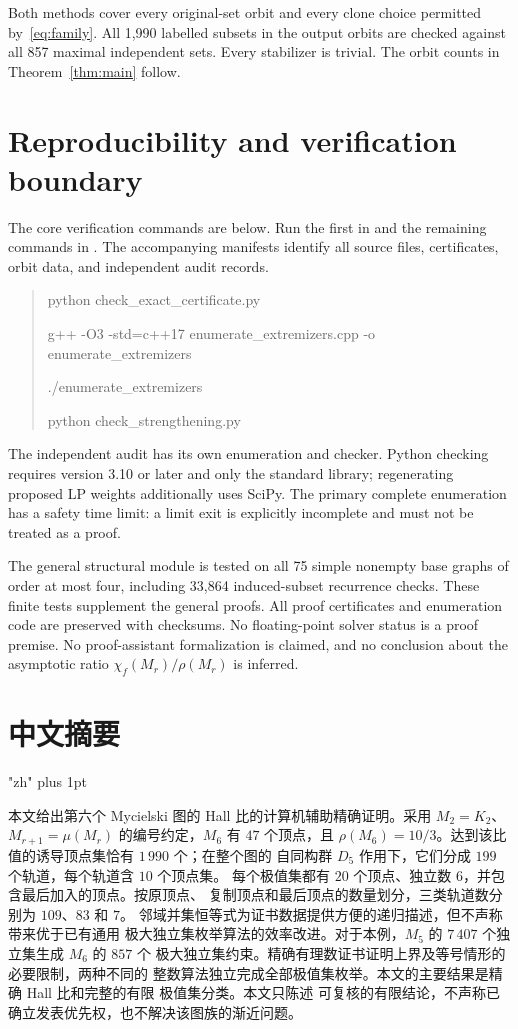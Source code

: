 \documentclass[11pt,letterpaper]{article}
\theoremstyle{remark}
\begin{document}
Both methods cover every original-set orbit and every clone choice
permitted by~\eqref{eq:family}. All 1,990 labelled subsets in the output
orbits are checked against all 857 maximal independent sets. Every
stabilizer is trivial. The orbit counts in Theorem~\ref{thm:main} follow.

\section{Reproducibility and verification boundary}
The core verification commands are below. Run the first in
 and the remaining commands in
. The accompanying manifests identify all
source files, certificates, orbit data, and independent audit records.
\begin{quote}\begin{minipage}{\linewidth}\small\ttfamily
python check\_exact\_certificate.py\par
 g++ -O3 -std=c++17 enumerate\_extremizers.cpp -o enumerate\_extremizers\par
 ./enumerate\_extremizers\par
 python check\_strengthening.py
\end{minipage}\end{quote}
The independent audit has its own enumeration and checker. Python checking requires version 3.10 or later and only the
standard library; regenerating proposed LP weights additionally uses
SciPy. The primary complete enumeration has a safety time limit: a limit
exit is explicitly incomplete and must not be treated as a proof.

The general structural module is tested on all 75 simple nonempty base
graphs of order at most four, including 33,864 induced-subset recurrence
checks. These finite tests supplement the general proofs. All proof
certificates and enumeration code are preserved with checksums.
No floating-point solver status is a proof premise. No proof-assistant
formalization is claimed, and no conclusion about the asymptotic ratio
$\chi_f(M_r)/\rho(M_r)$ is inferred.

\section*{\chinesefont 中文摘要}
\begingroup\chinesefont
\XeTeXlinebreaklocale "zh"
\XeTeXlinebreakskip=0pt plus 1pt

本文给出第六个 Mycielski 图的 Hall 比的计算机辅助精确证明。采用
$M_2=K_2$、$M_{r+1}=\mu(M_r)$ 的编号约定，$M_6$ 有 $47$ 个顶点，且
$\rho(M_6)=10/3$。达到该比值的诱导顶点集恰有 $1\,990$ 个；在整个图的
自同构群 $D_5$ 作用下，它们分成 $199$ 个轨道，每个轨道含 $10$ 个顶点集。
每个极值集都有 $20$ 个顶点、独立数 $6$，并包含最后加入的顶点。按原顶点、
复制顶点和最后顶点的数量划分，三类轨道数分别为 $109$、$83$ 和 $7$。
邻域并集恒等式为证书数据提供方便的递归描述，但不声称带来优于已有通用
极大独立集枚举算法的效率改进。对于本例，$M_5$ 的 $7\,407$ 个独立集生成 $M_6$ 的 $857$ 个
极大独立集约束。精确有理数证书证明上界及等号情形的必要限制，两种不同的
整数算法独立完成全部极值集枚举。本文的主要结果是精确 Hall 比和完整的有限
极值集分类。本文只陈述
可复核的有限结论，不声称已确立发表优先权，也不解决该图族的渐近问题。
\end{document}
